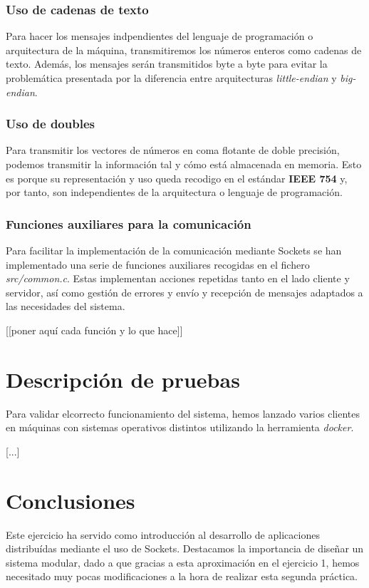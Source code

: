 \documentclass[]{article}
\begin{document}
\subsubsection{Uso de cadenas de texto}
\label{subsec:cadenas-texto}
Para hacer los mensajes indpendientes del lenguaje de programación o arquitectura de la máquina, transmitiremos los números enteros como cadenas de texto. Además, los mensajes serán transmitidos byte a byte para evitar la problemática presentada por la diferencia entre  arquitecturas \textit{little-endian} y \textit{big-endian}.

\subsubsection{Uso de doubles}
\label{subsec:double}
Para transmitir los vectores de números en coma flotante de doble precisión, podemos transmitir la información tal y cómo está almacenada en memoria. Esto es porque su representación y uso queda recodigo en el estándar \textbf{IEEE 754} y, por tanto, son independientes de la arquitectura o lenguaje de programación.

\subsubsection{Funciones auxiliares para la comunicación}
\label{subsec:funciones}
Para facilitar la implementación de la comunicación mediante Sockets se han implementado una serie de funciones auxiliares recogidas en el fichero \textit{src/common.c}. Estas implementan acciones repetidas tanto en el lado cliente y servidor, así como gestión de errores y envío y recepción de mensajes adaptados a las necesidades del sistema. 

[[poner aquí cada función y lo que hace]]

\section{Descripción de pruebas}
\label{sec:descripcion_de_pruebas}
Para validar elcorrecto funcionamiento del sistema, hemos lanzado varios clientes en máquinas con sistemas operativos distintos utilizando la herramienta \textit{docker}.

[...]

\section{Conclusiones}
\label{sec:conclusiones}
Este ejercicio ha servido como introducción al desarrollo de aplicaciones distribuídas mediante el uso de Sockets. Destacamos la importancia de diseñar un sistema modular, dado a que gracias a esta aproximación en el ejercicio 1, hemos necesitado muy pocas modificaciones a la hora de realizar esta segunda práctica. 
\end{document}
